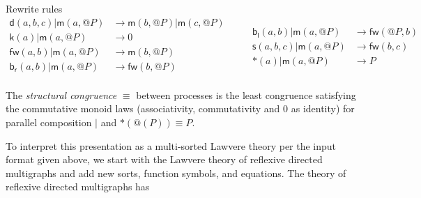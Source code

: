 \documentclass{llncs}
\makeatletter
\renewcommand{\:}{\colon}
\newcommand{\bc}{\mathbin{\mathbf{::=}}}
\newcommand{\bm}{\mathbin{\mathbf\mid}}
\newcommand{\quotep}[1]{\mathsf{@}#1}
\newcommand{\red}{\rightarrow}
\newcommand{\scong}{\mathbin{\equiv}}
\newcommand{\pzero}{\mathbin{0}}
\makeatother
\begin{document}

Rewrite rules
\[\begin{array}{rl}
\mathsf{d}(a,b,c) | \mathsf{m}(a,\quotep{P}) & \red \mathsf{m}(b,\quotep{P}) | \mathsf{m}(c,\quotep{P}) \\
\mathsf{k}(a) | \mathsf{m}(a,\quotep{P}) & \red 0 \\
\mathsf{fw}(a,b) | \mathsf{m}(a,\quotep{P}) & \red \mathsf{m}(b,\quotep{P}) \\
\mathsf{b}_{\mathsf{r}}(a,b) | \mathsf{m}(a,\quotep{P}) & \red \mathsf{fw}(b,\quotep{P}) \\  
\end{array} \quad \quad
\begin{array}{rl}
  \mathsf{b}_{\mathsf{l}}(a,b) | \mathsf{m}(a,\quotep{P}) & \red \mathsf{fw}(\quotep{P},b) \\
  \mathsf{s}(a,b,c) | \mathsf{m}(a,\quotep{P}) & \red \mathsf{fw}(b,c) \\
  *(a) | \mathsf{m}(a,\quotep{P}) & \red P
\end{array}\]

\begin{definition}
  The {\em structural congruence} $\equiv$
  between processes \cite{SangiorgiWalker} is the least congruence
  satisfying the commutative monoid laws
  (associativity, commutativity and $\pzero$ as identity) for parallel
  composition $|$ and $*(@(P)) \equiv P$.
\end{definition}

To interpret this presentation as a multi-sorted Lawvere theory per
the input format given above, we start with the Lawvere theory of
reflexive directed multigraphs and add new sorts, function symbols,
and equations.  The theory of reflexive directed multigraphs has

\end{document}

